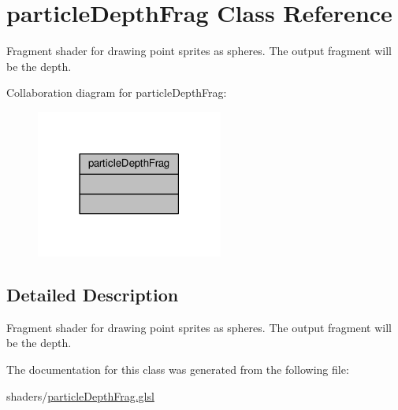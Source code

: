 \hypertarget{classparticle_depth_frag}{\section{particle\-Depth\-Frag Class Reference}
\label{classparticle_depth_frag}
}


Fragment shader for drawing point sprites as spheres. The output fragment will be the depth.  




Collaboration diagram for particle\-Depth\-Frag\-:\nopagebreak
\begin{figure}[H]
\begin{center}
\leavevmode
\includegraphics[width=174pt]{classparticle_depth_frag__coll__graph}
\end{center}
\end{figure}


\subsection{Detailed Description}
Fragment shader for drawing point sprites as spheres. The output fragment will be the depth. 

The documentation for this class was generated from the following file\-:\begin{DoxyCompactItemize}
\item 
shaders/\hyperlink{particle_depth_frag_8glsl}{particle\-Depth\-Frag.\-glsl}\end{DoxyCompactItemize}
